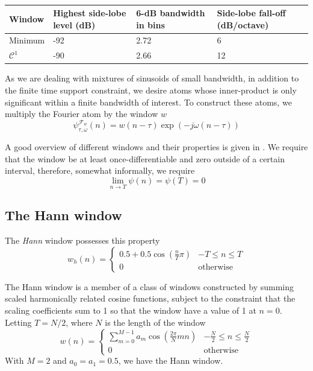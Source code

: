 \begin{table}
    \caption{\label{tab:optvs4termblackman}}
    \begin{center}
        \begin{tabular}{l p{} p{} p{}}
            Window & Highest side-lobe level (dB) & 6-dB bandwidth in bins &
            Side-lobe fall-off (dB/octave) \\
            \hline
            Minimum & -92 & 2.72 & 6 \\
            $\mathcal{C}^{1}$ & -90 & 2.66 & 12 \\
        \end{tabular}
    \end{center}
\end{table}

As we are dealing with mixtures of sinusoids of small bandwidth, in addition to
the finite time support constraint, we desire atoms whose inner-product is only
significant within a finite bandwidth of interest. To construct these atoms, we
multiply the Fourier atom by the window $w$
\[
    \psi_{\tau,\omega}^{\mathcal{F}_{w}}(n) = w(n-\tau) \exp(-j\omega(n-\tau))
\]

A good overview of different windows and their properties is given in
\cite{harris1978use}. We require that the window be at least
once-differentiable and zero outside of a certain interval, therefore, somewhat
informally, we require
\[
    \lim_{n \rightarrow T} \psi(n) = \psi(T) = 0
\]

\subsection{The Hann window}

The \textit{Hann} window possesses this property
\[
    w_{h}(n) = \begin{cases}
        0.5 + 0.5 \cos \left( \frac{n}{T}\pi \right) & -T \leq n \leq T \\
        0 & \text{otherwise}
    \end{cases}
\]

The Hann window is a member of a class of windows constructed by summing scaled
harmonically related cosine functions, subject to the constraint that the
scaling coefficients sum to 1 so that the window have a value of 1 at $n=0$.
Letting $T=N/2$, where $N$ is the length of the window
\[
    w(n) = \begin{cases}
        \sum_{m=0}^{M-1}a_{m}\cos \left( \frac{2\pi}{N}mn \right) & -\frac{N}{2} \leq n
        \leq \frac{N}{2} \\
        0 & \text{otherwise}
    \end{cases}
\]
With $M=2$ and $a_0 = a_1 = 0.5$, we have the Hann window.

